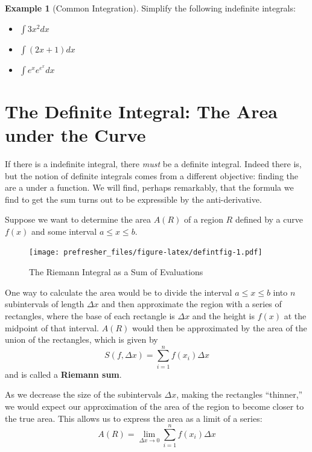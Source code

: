 \documentclass[
]{book}
\providecommand{\tightlist}{%
  \setlength{\itemsep}{0pt}\setlength{\parskip}{0pt}}
\theoremstyle{definition}
\theoremstyle{definition}
\newtheorem{example}{Example}[chapter]
\theoremstyle{definition}
\theoremstyle{remark}
\begin{document}
\begin{example}[Common Integration]
\protect\hypertarget{exm:unnamed-chunk-25}{}{\label{exm:unnamed-chunk-25} {} }Simplify the following indefinite integrals:

\begin{itemize}
\tightlist
\item
  \(\int 3x^2 dx\)
\item
  \(\int (2x+1)dx\)
\item
  \(\int e^x e^{e^x} dx\)
\end{itemize}
\end{example}

\hypertarget{the-definite-integral-the-area-under-the-curve}{%
\section{The Definite Integral: The Area under the Curve}\label{the-definite-integral-the-area-under-the-curve}}

If there is a indefinite integral, there \emph{must} be a definite integral. Indeed there is, but the notion of definite integrals comes from a different objective: finding the are a under a function. We will find, perhaps remarkably, that the formula we find to get the sum turns out to be expressible by the anti-derivative.

Suppose we want to determine the area \(A(R)\) of a region \(R\) defined by a curve \(f(x)\) and some interval \(a\le x \le b\).

\begin{figure}
\centering
\texttt{[image: prefresher\_files/figure-latex/defintfig-1.pdf]}
\caption{\label{fig:defintfig}The Riemann Integral as a Sum of Evaluations}
\end{figure}

One way to calculate the area would be to divide the interval \(a\le x\le b\) into \(n\) subintervals of length \(\Delta x\) and then approximate the region with a series of rectangles, where the base of each rectangle is \(\Delta x\) and the height is \(f(x)\) at the midpoint of that interval. \(A(R)\) would then be approximated by the area of the union of the rectangles, which is given by \[S(f,\Delta x)=\sum\limits_{i=1}^n f(x_i)\Delta x\] and is called a \textbf{Riemann sum}.

As we decrease the size of the subintervals \(\Delta x\), making the rectangles ``thinner,'' we would expect our approximation of the area of the region to become closer to the true area. This allows us to express the area as a limit of a series:
\[A(R)=\lim\limits_{\Delta x\to 0}\sum\limits_{i=1}^n f(x_i)\Delta x\]
\end{document}
